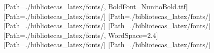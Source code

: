 
\usepackage{fontspec}
\setmainfont{NunitoRegular.ttf}[Path=./bibliotecas_latex/fonts/, BoldFont=NunitoBold.ttf]
\newfontfamily{}[Path=./bibliotecas_latex/fonts/]
\newfontfamily{}[Path=./bibliotecas_latex/fonts/]
\newfontfamily{}[Path=./bibliotecas_latex/fonts/]
\newfontfamily{}[Path=./bibliotecas_latex/fonts/]
\newfontfamily{}[Path=./bibliotecas_latex/fonts/, WordSpace=2.4]
\newfontfamily{}[Path=./bibliotecas_latex/fonts/]
\newfontfamily{}[Path=./bibliotecas_latex/fonts/]

